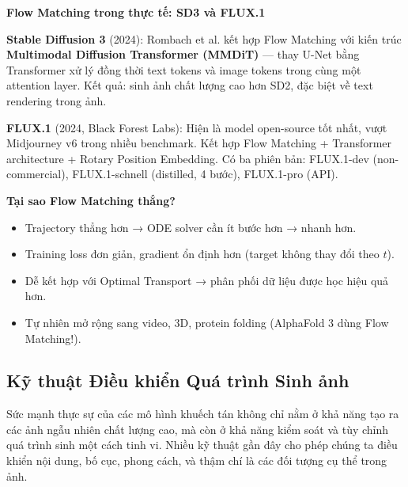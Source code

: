 \begin{mdframed}[style=infobox]
\textbf{Flow Matching trong thực tế: SD3 và FLUX.1}

\textbf{Stable Diffusion 3} (2024): Rombach et al. kết hợp Flow Matching với kiến trúc \textbf{Multimodal Diffusion Transformer (MMDiT)} --- thay U-Net bằng Transformer xử lý đồng thời text tokens và image tokens trong cùng một attention layer. Kết quả: sinh ảnh chất lượng cao hơn SD2, đặc biệt về text rendering trong ảnh.

\textbf{FLUX.1} (2024, Black Forest Labs): Hiện là model open-source tốt nhất, vượt Midjourney v6 trong nhiều benchmark. Kết hợp Flow Matching + Transformer architecture + Rotary Position Embedding. Có ba phiên bản: FLUX.1-dev (non-commercial), FLUX.1-schnell (distilled, 4 bước), FLUX.1-pro (API).

\textbf{Tại sao Flow Matching thắng?}
\begin{itemize}
    \item Trajectory thẳng hơn → ODE solver cần ít bước hơn → nhanh hơn.
    \item Training loss đơn giản, gradient ổn định hơn (target không thay đổi theo $t$).
    \item Dễ kết hợp với Optimal Transport → phân phối dữ liệu được học hiệu quả hơn.
    \item Tự nhiên mở rộng sang video, 3D, protein folding (AlphaFold 3 dùng Flow Matching!).
\end{itemize}
\end{mdframed}

\subsection{Kỹ thuật Điều khiển Quá trình Sinh ảnh}
\label{subsec:diffusion_control_techniques}

Sức mạnh thực sự của các mô hình khuếch tán không chỉ nằm ở khả năng tạo ra các ảnh ngẫu nhiên chất lượng cao, mà còn ở khả năng kiểm soát và tùy chỉnh quá trình sinh một cách tinh vi. Nhiều kỹ thuật gần đây cho phép chúng ta điều khiển nội dung, bố cục, phong cách, và thậm chí là các đối tượng cụ thể trong ảnh.

